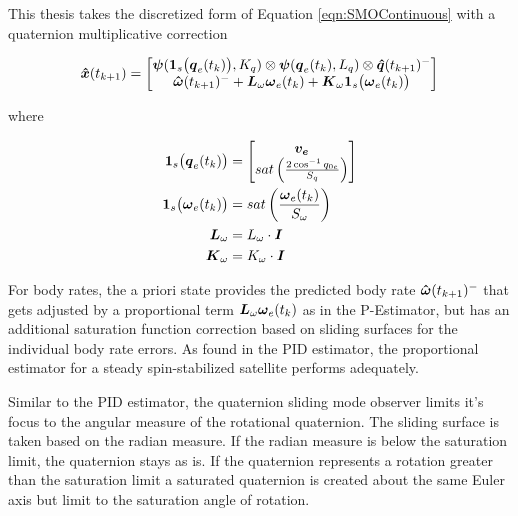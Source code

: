 This thesis takes the discretized form of Equation \ref{eqn:SMOContinuous} with a quaternion multiplicative correction

\begin{equation}
  \boldsymbol{\hat{x}}(t_{k+1}) = \begin{bmatrix} \boldsymbol{\psi} (\boldsymbol{1}_s\big(\boldsymbol{q}_{e}(t_k)\big), K_q) \otimes \boldsymbol{\psi}(\boldsymbol{q}_e(t_{k}), L_{q})  \otimes \boldsymbol{\hat{q}}(t_{k+1})^- \\
  \boldsymbol{\hat{\omega}}(t_{k+1})^- + \boldsymbol{L}_{\omega} \boldsymbol{\omega}_e(t_{k}) + \boldsymbol{K}_{\omega}\boldsymbol{1}_s \big(\boldsymbol{\omega}_e(t_{k}) \big) \end{bmatrix}
  \label{eqn:SMOEstimatorwithPredictionUnforcedMotion}
\end{equation}

where

\begin{subequations}
  \begin{align}
    \boldsymbol{1}_s\big(\boldsymbol{q}_{e}(t_k) \big) &= \begin{bmatrix} \boldsymbol{v_e} \\ sat\left( \frac{2\cos^{-1} q_{0e} }{S_{q}} \right) \end{bmatrix} \\
    \boldsymbol{1}_s \big(\boldsymbol{\omega}_e(t_{k}) \big) &= sat\left( \frac{\boldsymbol{\omega}_e(t_{k})}{S_{\omega}} \right) \\
    \boldsymbol{L}_{\omega} &= L_\omega \cdot \boldsymbol{I} \\
    \boldsymbol{K}_{\omega} &= K_\omega \cdot \boldsymbol{I}
  \end{align}
\end{subequations}

For body rates, the a priori state provides the predicted body rate $\boldsymbol{\hat{\omega}}(t_{k+1})^-$ that gets adjusted by a proportional term $\boldsymbol{L}_{\omega} \boldsymbol{\omega}_e(t_{k})$ as in the P-Estimator, but has an additional saturation function correction based on sliding surfaces for the individual body rate errors.  As found in the PID estimator, the proportional estimator for a steady spin-stabilized satellite performs adequately.

Similar to the PID estimator, the quaternion sliding mode observer limits it's focus to the angular measure of the rotational quaternion.  The sliding surface is taken based on the radian measure.  If the radian measure is below the saturation limit, the quaternion stays as is.  If the quaternion represents a rotation greater than the saturation limit a saturated quaternion is created about the same Euler axis but limit to the saturation angle of rotation.

